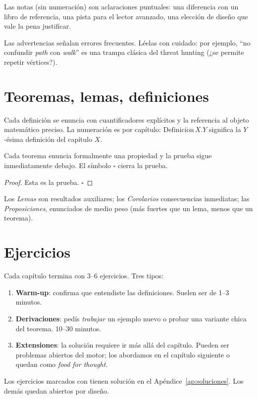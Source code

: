 \begin{nota}
Las notas (sin numeración) son aclaraciones puntuales: una
diferencia con un libro de referencia, una pista para el lector
avanzado, una elección de diseño que vale la pena justificar.
\end{nota}

\begin{advertencia}
Las advertencias señalan errores frecuentes. Léelas con cuidado: por
ejemplo, ``no confundir \emph{path} con \emph{walk}'' es una trampa
clásica del threat hunting (¿se permite repetir vértices?).
\end{advertencia}

\section*{Teoremas, lemas, definiciones}

\begin{definition}[Plantilla]
Cada definición se enuncia con cuantificadores explícitos y la
referencia al objeto matemático preciso. La numeración es por
capítulo: \(\mathrm{Definici\acute{o}n}\,X.Y\) significa la \(Y\)-ésima
definición del capítulo \(X\).
\end{definition}

\begin{theorem}[Plantilla]
Cada teorema enuncia formalmente una propiedad y la prueba sigue
inmediatamente debajo. El símbolo \(\square\) cierra la prueba.
\end{theorem}

\begin{proof}
Esta es la prueba. \(\square\)
\end{proof}

Los \emph{Lemas} son resultados auxiliares; los \emph{Corolarios}
consecuencias inmediatas; las \emph{Proposiciones}, enunciados de
medio peso (más fuertes que un lema, menos que un teorema).

\section*{Ejercicios}

\begin{ejercicios}
Cada capítulo termina con 3--6 ejercicios. Tres tipos:

\begin{enumerate}
    \item \textbf{Warm-up}: confirma que entendiste las definiciones.
    Suelen ser de 1--3 minutos.
    \item \textbf{Derivaciones}: pedís \emph{trabajar} un ejemplo
    nuevo o probar una variante chica del teorema. 10--30 minutos.
    \item \textbf{Extensiones}: la solución requiere ir más allá del
    capítulo. Pueden ser problemas abiertos del motor; los abordamos
    en el capítulo siguiente o quedan como \emph{food for thought}.
\end{enumerate}

Los ejercicios marcados con \starred{} tienen solución en el
Apéndice~\ref{ap:soluciones}. Los demás quedan abiertos por diseño.
\end{ejercicios}


